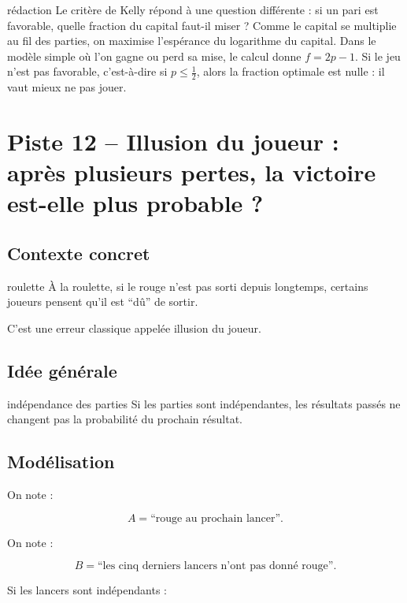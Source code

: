 \documentclass[11pt,a4paper]{article}
\begin{document}
\begin{oral}{rédaction}
Le critère de Kelly répond à une question différente : si un pari est favorable, quelle fraction du capital faut-il miser ? Comme le capital se multiplie au fil des parties, on maximise l'espérance du logarithme du capital. Dans le modèle simple où l'on gagne ou perd sa mise, le calcul donne $f=2p-1$. Si le jeu n'est pas favorable, c'est-à-dire si $p\leq\frac12$, alors la fraction optimale est nulle : il vaut mieux ne pas jouer.
\end{oral}

\section{Piste 12 -- Illusion du joueur : après plusieurs pertes, la victoire est-elle plus probable ?}

\subsection{Contexte concret}

\begin{contexte}{roulette}
À la roulette, si le rouge n'est pas sorti depuis longtemps, certains joueurs pensent qu'il est ``dû'' de sortir.

C'est une erreur classique appelée illusion du joueur.
\end{contexte}

\subsection{Idée générale}

\begin{idee}{indépendance des parties}
Si les parties sont indépendantes, les résultats passés ne changent pas la probabilité du prochain résultat.
\end{idee}

\subsection{Modélisation}

On note :

\[
A=\text{``rouge au prochain lancer''}.
\]

On note :

\[
B=\text{``les cinq derniers lancers n'ont pas donné rouge''}.
\]

Si les lancers sont indépendants :
\end{document}
